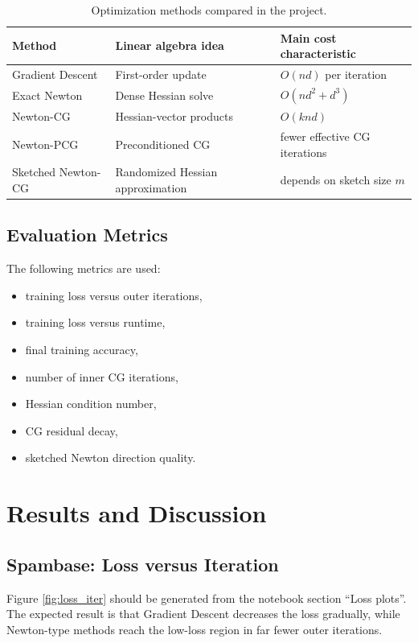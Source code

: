 \documentclass[12pt,a4paper]{report}
\begin{document}
\begin{table}[H]
\centering
\caption{Optimization methods compared in the project.}
\label{tab:method_summary}
\begin{tabular}{lll}
\toprule
Method & Linear algebra idea & Main cost characteristic \\
\midrule
Gradient Descent & First-order update & \(O(nd)\) per iteration \\
Exact Newton & Dense Hessian solve & \(O(nd^2+d^3)\) \\
Newton-CG & Hessian-vector products & \(O(knd)\) \\
Newton-PCG & Preconditioned CG & fewer effective CG iterations \\
Sketched Newton-CG & Randomized Hessian approximation & depends on sketch size \(m\) \\
\bottomrule
\end{tabular}
\end{table}

\section{Evaluation Metrics}

The following metrics are used:

\begin{itemize}
    \item training loss versus outer iterations,
    \item training loss versus runtime,
    \item final training accuracy,
    \item number of inner CG iterations,
    \item Hessian condition number,
    \item CG residual decay,
    \item sketched Newton direction quality.
\end{itemize}

\chapter{Results and Discussion}

\section{Spambase: Loss versus Iteration}

Figure \ref{fig:loss_iter} should be generated from the notebook section ``Loss plots''. The expected result is that Gradient Descent decreases the loss gradually, while Newton-type methods reach the low-loss region in far fewer outer iterations.
\end{document}
